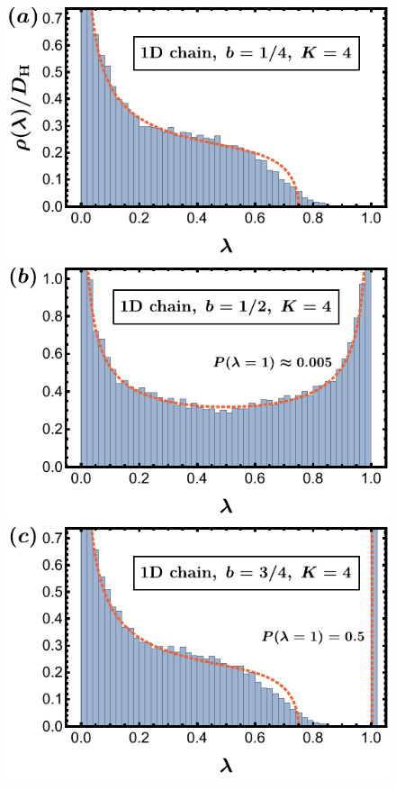 \documentclass[%
 reprint,
 superscriptaddress,
 amsmath,amssymb,
prx,
]{revtex4-2}\href{\href{}{}}{}
\begin{document}
\begin{figure}[t] 
 	\includegraphics[width = 0.63\columnwidth]{1D_depth4_lam_W_distr_b14.pdf}\qquad
	\includegraphics[width = 0.63\columnwidth]{1D_depth4_lam_W_distr_b12.pdf}\qquad
	\includegraphics[width = 0.63\columnwidth]{1D_depth4_lam_W_distr_b34.pdf}\qquad
 
    \vspace{0.2cm}
    

\end{figure}
\end{document}
